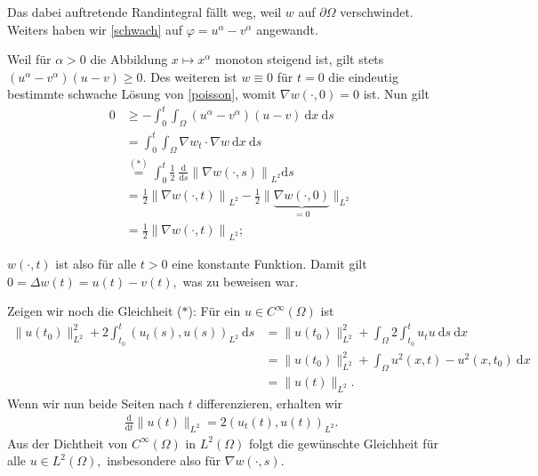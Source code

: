 \begin{solution}
Das dabei auftretende Randintegral fällt weg, weil $w$ auf $\partial\Omega$ verschwindet. Weiters haben wir \eqref{schwach} auf $\varphi = u^\alpha - v^\alpha$ angewandt.

Weil für $\alpha > 0$ die Abbildung $x \mapsto x^\alpha$ monoton steigend ist, gilt stets $(u^\alpha - v^\alpha) (u-v) \geq 0.$ Des weiteren ist $w \equiv 0$ für $t = 0$ die eindeutig bestimmte schwache Lösung von \eqref{poisson}, womit $\nabla w(\cdot, 0) = 0$ ist. Nun gilt
\begin{align*}
    0 &\geq - \int_0^t \int_\Omega (u^\alpha - v^\alpha) (u-v) \mathrm{~d}x \mathrm{~d}s\\
    &= \int_0^t \int_\Omega \nabla w_t \cdot \nabla w \mathrm{~d}x \mathrm{~d}s\\
    &\stackrel{(\ast)}{=} \int_0^t \frac{1}{2} ~\frac{\mathrm{d}}{\mathrm{d}s} \left\| \nabla w(\cdot, s)\right\|_{L^2} \mathrm{d}s\\
    &= \frac{1}{2} \left\| \nabla w(\cdot, t)\right\|_{L^2} - \frac{1}{2} \| \underbrace{\nabla w(\cdot, 0)}_{=0}\|_{L^2}\\
    &= \frac{1}{2} \left\| \nabla w(\cdot, t)\right\|_{L^2};
\end{align*}

$w(\cdot, t)$ ist also für alle $t > 0$ eine konstante Funktion. Damit gilt $0 = \Delta w(t) = u(t) - v(t),$ was zu beweisen war.

Zeigen wir noch die Gleichheit ($\ast$): Für ein $u \in C^\infty(\Omega)$ ist
\begin{align*}
    \|u(t_0)\|^2_{L^2} + 2 \int_{t_0}^{t} (u_t(s), u(s))_{L^2} \mathrm{~d}s
    &= \|u(t_0)\|^2_{L^2} + \int_\Omega 2 \int_{t_0}^{t} u_t u \mathrm{~d}s \mathrm{~d}x\\
    &= \|u(t_0)\|^2_{L^2} + \int_\Omega u^2(x, t) - u^2(x, t_0) \mathrm{~d}x\\
    &= \| u(t)\|_{L^2}.
\end{align*}
Wenn wir nun beide Seiten nach $t$ differenzieren, erhalten wir
\begin{align*}
    \frac{\mathrm{d}}{\mathrm{d}t} \|u(t)\|_{L^2} = 2 \left(u_t(t), u(t)\right)_{L^2}.
\end{align*}
Aus der Dichtheit von $C^\infty(\Omega)$ in $L^2(\Omega)$ folgt die gewünschte Gleichheit für alle $u \in L^2(\Omega),$ insbesondere also für $\nabla w(\cdot, s).$
\end{solution}

